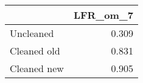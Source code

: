 \begin{tabular}{lr}
\toprule
{} & LFR_om_7 \\
\midrule
Uncleaned   &    0.309 \\
Cleaned old &    0.831 \\
Cleaned new &    0.905 \\
\bottomrule
\end{tabular}
